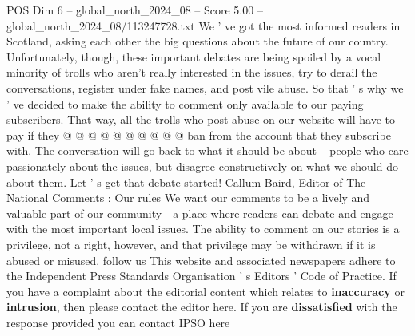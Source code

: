 \begin{textsample}{POS Dim 6 – global\_north\_2024\_08 – Score 5.00 – global\_north\_2024\_08/113247728.txt}
We ' ve got the most informed readers in Scotland, asking each other the big questions about the future of our country.
Unfortunately, though, these important debates are being spoiled by a vocal minority of trolls who aren't really interested in the issues, try to derail the conversations, register under fake names, and post vile abuse.
So that ' s why we ' ve decided to make the ability to comment only available to our paying subscribers.
That way, all the trolls who post abuse on our website will have to pay if they @ @ @ @ @ @ @ @ @ @ ban from the account that they subscribe with.
The conversation will go back to what it should be about -- people who care passionately about the issues, but disagree constructively on what we should do about them.
Let ' s get that debate started!
Callum Baird, Editor of The National Comments : Our rules We want our comments to be a lively and valuable part of our community - a place where readers can debate and engage with the most important local issues.
The ability to comment on our stories is a privilege, not a right, however, and that privilege may be withdrawn if it is abused or misused. follow us This website and associated newspapers adhere to the Independent Press Standards Organisation ' s Editors ' Code of Practice.
If you have a complaint about the editorial content which relates to \textbf{inaccuracy} or \textbf{intrusion}, then please contact the editor here.
If you are \textbf{dissatisfied} with the response provided you can contact IPSO here

\end{textsample}
